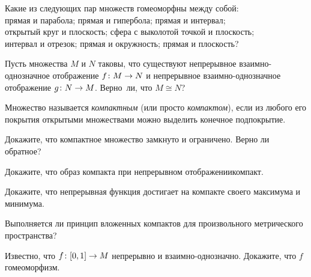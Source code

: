\documentclass[a4paper,12pt]{article}
\begin{document}
Какие из следующих пар множеств гомеоморфны между собой:\\
прямая и парабола;
прямая и гипербола;
прямая и интервал;\\
открытый круг и плоскость;
сфера с выколотой точкой и плоскость;\\
интервал и отрезок;
прямая и окружность;
прямая и плоскость?

Пусть множества $M$ и $N$ таковы, что существуют непрерывное взаимно-однозначное отображение $f \colon M \rightarrow N$ и непрерывное взаимно-однозначное отображение $g \colon N \rightarrow M$. Верно~ли, что $M \cong N$?

Множество называется \emph{компактным} (или просто \emph{компактом}), если из любого его покрытия открытыми множествами можно выделить конечное подпокрытие.

Докажите, что компактное множество замкнуто и ограничено. Верно ли обратное?

Докажите, что образ компакта при непрерывном отображении\т компакт.

Докажите, что непрерывная функция достигает на компакте своего максимума и минимума.

Выполняется ли принцип вложенных компактов для произвольного метрического пространства?

Известно, что $f \colon [0, 1] \rightarrow M$ непрерывно и взаимно-однозначно. Докажите, что $f$\т гомеоморфизм.



\end{document}
